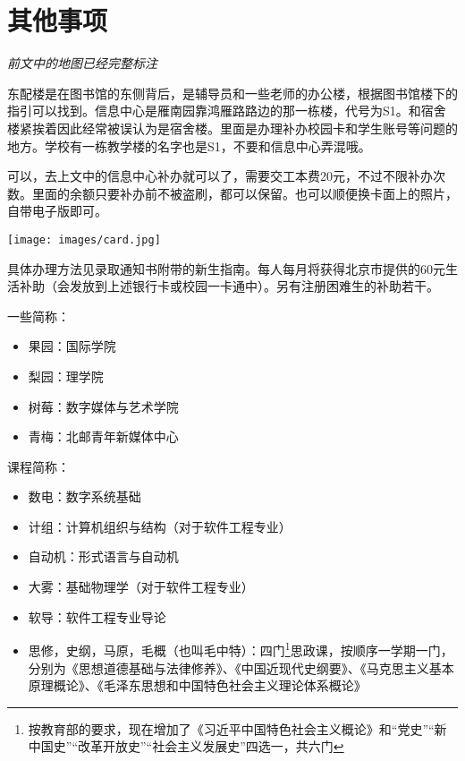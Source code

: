 \section{其他事项}


\emph{前文中的地图已经完整标注}

东配楼是在图书馆的东侧背后，是辅导员和一些老师的办公楼，根据图书馆楼下的指引可以找到。信息中心是雁南园靠鸿雁路路边的那一栋楼，代号为S1。和宿舍楼紧挨着因此经常被误认为是宿舍楼。里面是办理补办校园卡和学生账号等问题的地方。学校有一栋教学楼的名字也是S1，不要和信息中心弄混哦。


可以，去上文中的信息中心补办就可以了，需要交工本费20元，不过不限补办次数。里面的余额只要补办前不被盗刷，都可以保留。也可以顺便换卡面上的照片，自带电子版即可。


\begin{center}
    \texttt{[image: images/card.jpg]}
\end{center}

具体办理方法见录取通知书附带的新生指南。每人每月将获得北京市提供的60元生活补助（会发放到上述银行卡或校园一卡通中）。另有注册困难生的补助若干。


一些简称：
\begin{itemize}
    \item 果园：国际学院
    \item 梨园：理学院
    \item 树莓：数字媒体与艺术学院
    \item 青梅：北邮青年新媒体中心
\end{itemize}

课程简称：
\begin{itemize}
    \item 数电：数字系统基础
    \item 计组：计算机组织与结构（对于软件工程专业）
    \item 自动机：形式语言与自动机
    \item 大雾：基础物理学（对于软件工程专业）
    \item 软导：软件工程专业导论
    \item 思修，史纲，马原，毛概（也叫毛中特）：四门\footnote{按教育部的要求，现在增加了《习近平中国特色社会主义概论》和“党史”“新中国史”“改革开放史”“社会主义发展史”四选一，共六门}思政课，按顺序一学期一门，分别为《思想道德基础与法律修养》、《中国近现代史纲要》、《马克思主义基本原理概论》、《毛泽东思想和中国特色社会主义理论体系概论》
\end{itemize}

